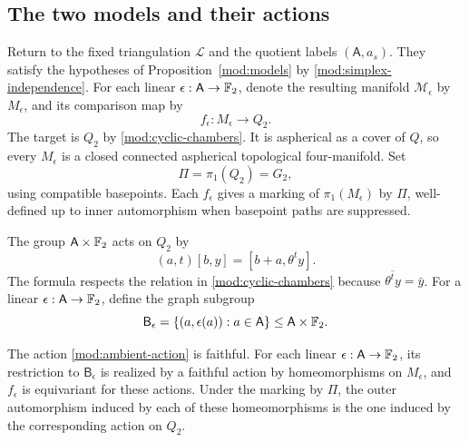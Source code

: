 \subsection{The two models and their actions}

Return to the fixed triangulation \(\mathcal L\) and the quotient labels
\((\mathsf A,a_s)\).  They satisfy the hypotheses of
Proposition~\ref{mod:models} by \eqref{mod:simplex-independence}.
For each linear \(\epsilon:\mathsf A\to\mathbb F_2\), denote the resulting
manifold \(\mathcal M_\epsilon\) by \(M_\epsilon\), and its comparison
map by
\[
 f_\epsilon:M_\epsilon\longrightarrow Q_2.
\]
The target is \(Q_2\) by \eqref{mod:cyclic-chambers}.  It is
aspherical as a cover of \(Q\), so every \(M_\epsilon\) is a closed
connected aspherical topological four-manifold.  Set
\begin{equation}\label{mod:common-group}
 \Pi=\pi_1(Q_2)=G_2,
\end{equation}
using compatible basepoints.  Each \(f_\epsilon\) gives a marking of
\(\pi_1(M_\epsilon)\) by \(\Pi\), well-defined up to inner
automorphism when basepoint paths are suppressed.

The group \(\mathsf A\times\mathbb F_2\) acts on \(Q_2\) by
\begin{equation}\label{mod:ambient-action}
 (a,t)[b,y]=[b+a,\theta^t y].
\end{equation}
The formula respects the relation in \eqref{mod:cyclic-chambers}
because \(\overline{\theta^t y}=\bar y\).  For a linear
\(\epsilon:\mathsf A\to\mathbb F_2\), define the graph subgroup
\begin{equation}\label{mod:graph-subgroup}
 \mathsf B_\epsilon
    =\{(a,\epsilon(a)):a\in\mathsf A\}
    \leq\mathsf A\times\mathbb F_2.
\end{equation}

\begin{proposition}\label{mod:actions}
The action \eqref{mod:ambient-action} is faithful.  For each linear
\(\epsilon:\mathsf A\to\mathbb F_2\), its restriction to
\(\mathsf B_\epsilon\) is realized by a faithful action by
homeomorphisms on \(M_\epsilon\), and \(f_\epsilon\) is equivariant
for these actions.  Under the marking by \(\Pi\), the outer
automorphism induced by each of these homeomorphisms is the one
induced by the corresponding action on \(Q_2\).
\end{proposition}

